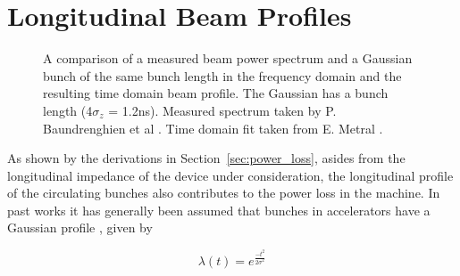 \documentclass{cernrep}
\begin{document}
\section{Longitudinal Beam Profiles}

\begin{figure}
\caption{A comparison of  a measured beam power spectrum and a Gaussian bunch of the same bunch length in the frequency domain and  the resulting time domain beam profile. The Gaussian has a bunch length (4$\sigma_{z}$ = 1.2ns). Measured spectrum taken by P. Baundrenghien et al \cite{Baudrenghien:LHCPowSpec}. Time domain fit taken from E. Metral \cite{Metral:Heating}.}
\label{fig:measured_gauss}
\end{figure}

As shown by the derivations in Section~\ref{sec:power_loss}, asides from the longitudinal impedance of the device under consideration, the longitudinal profile of the circulating bunches also contributes to the power loss in the machine. In past works it has generally been assumed that bunches in accelerators have a Gaussian profile \cite{Grudiev:LongTransSecCol}, given by

\begin{equation}
\lambda \left( t \right) = e^{\frac{-t^{2}}{2\sigma^{2}}}
\label{eqn:gauss}
\end{equation}
\end{document}
